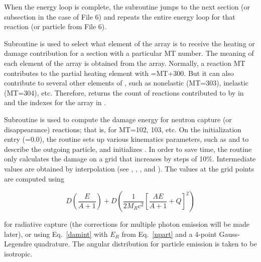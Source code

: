 When the energy loop is complete, the subroutine jumps to the
next section (or subsection in the case of File 6) and repeats the
entire energy loop for that reaction (or particle from File 6).

Subroutine  is used to
select what element of the  array is to receive the
heating or damage contribution for a section with a particular
MT number.  The meaning of each element of the  array
is obtained from the  array.  Normally, a reaction
MT contributes to the partial heating element with
=MT+300.  But it can also contribute to
several other elements of , such as nonelastic
(MT=303), inelastic (MT=304), etc.  Therefore, 
returns the count of reactions contributed to by 
in  and the indexes for the  array in
.

Subroutine 
is used to compute the damage energy for neutron capture
(or disappearance) reactions; that is, for MT=102, 103,
etc.  On the initialization entry (=0.0), the
routine sets up various kinematics parameters, such as 
and  to describe the outgoing particle, and initializes
.  In order to save time, the routine only calculates the
damage on a grid that increases by steps of 10\%.  Intermediate
values are obtained by interpolation (see , ,
, and ).  The values at the grid points
are computed using

\begin{equation}
   D\left(\frac{E}{A+1}\right)
    +D\left(\frac{1}{2M_Rc^2}\left[\frac{AE}{A+1}+Q\right]^2\right)
\end{equation}

\noindent
for radiative capture (the corrections for multiple photon emission
will be made later), or using Eq.~\ref{damint} with $E_R$
from Eq.~\ref{npart} and a 4-point Gauss-Legendre
 quadrature.  The angular
distribution for particle emission is taken to be isotropic.

